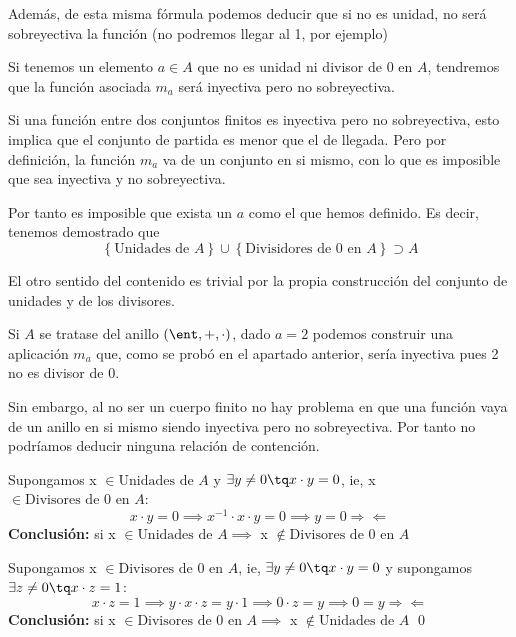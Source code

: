 \begin{problem}[10]
	Además, de esta misma fórmula podemos deducir que si no es unidad, no será sobreyectiva la función (no podremos llegar al 1, por ejemplo)

	\spart

	Si tenemos un elemento $a \in A$ que no es unidad ni divisor de 0 en $A$, tendremos que la función asociada $m_a$ será inyectiva pero no sobreyectiva.

	Si una función entre dos conjuntos finitos es inyectiva pero no sobreyectiva, esto implica que el conjunto de partida es menor que el de llegada. Pero por definición, la función $m_a$ va de un conjunto en si mismo, con lo que es imposible que sea inyectiva y no sobreyectiva.

	Por tanto es imposible que exista un $a$ como el que hemos definido. Es decir, tenemos demostrado que
	\[\left\{ \text{Unidades de } A \right\} \cup \left\{ \text{Divisidores de 0 en } A \right\} \supset A\]

	El otro sentido del contenido es trivial por la propia construcción del conjunto de unidades y de los divisores.

	\spart

	Si $A$ se tratase del anillo $(\ent, +, \cdot )$, dado $a=2$ podemos construir una aplicación $m_a$ que, como se probó en el apartado anterior, sería inyectiva pues 2 no es divisor de 0.

	Sin embargo, al no ser un cuerpo finito no hay problema en que una función vaya de un anillo en si mismo siendo inyectiva pero no sobreyectiva. Por tanto no podríamos deducir ninguna relación de contención.


	\spart[a]

	Supongamos x $\in \text{Unidades de } A$ y $\exists y \neq 0 \tq x\cdot y = 0$, ie, x $\in \text{Divisores de 0 en } A$:
	\[ x \cdot y = 0 \implies x^{-1} \cdot x \cdot y = 0 \implies y = 0 \Rightarrow \Leftarrow \]
	{\bf Conclusión:} si x $\in \text{Unidades de } A \implies$ x $\not\in \text{Divisores de 0 en } A$

	Supongamos x $\in \text{Divisores de 0 en } A$, ie, $\exists y \neq 0 \tq x \cdot y = 0$ y supongamos $\exists z \neq 0 \tq x \cdot z = 1$:
	\[ x \cdot z = 1 \implies y \cdot x \cdot z = y \cdot 1 \implies 0 \cdot z = y \implies 0 = y \Rightarrow \Leftarrow \]
	{\bf Conclusión:} si x $\in \text{Divisores de 0 en } A  \implies$ x $\not\in \text{Unidades de } A$
	\newline\qed

	\spart[b]


\end{problem}
